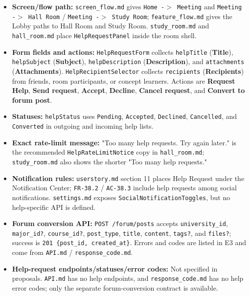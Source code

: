\documentclass[12pt]{article}
\begin{document}
\begin{itemize}
\item \textbf{Screen/flow path:} \texttt{screen\_flow.md} gives \texttt{Home -$>$ Meeting} and \texttt{Meeting -$>$ Hall Room} / \texttt{Meeting -$>$ Study Room}; \texttt{feature\_flow.md} gives the Lobby paths to Hall Room and Study Room. \texttt{study\_room.md} and \texttt{hall\_room.md} place \texttt{HelpRequestPanel} inside the room shell.
\item \textbf{Form fields and actions:} \texttt{HelpRequestForm} collects \texttt{helpTitle} (\textbf{Title}), \texttt{helpSubject} (\textbf{Subject}), \texttt{helpDescription} (\textbf{Description}), and \texttt{attachments} (\textbf{Attachments}). \texttt{HelpRecipientSelector} collects \texttt{recipients} (\textbf{Recipients}) from friends, room participants, or concept learners. Actions are \textbf{Request Help}, \textbf{Send request}, \textbf{Accept}, \textbf{Decline}, \textbf{Cancel request}, and \textbf{Convert to forum post}.
\item \textbf{Statuses:} \texttt{helpStatus} uses \texttt{Pending}, \texttt{Accepted}, \texttt{Declined}, \texttt{Cancelled}, and \texttt{Converted} in outgoing and incoming help lists.
\item \textbf{Exact rate-limit message:} "Too many help requests. Try again later." is the recommended \texttt{HelpRateLimitNotice} copy in \texttt{hall\_room.md}; \texttt{study\_room.md} also shows the shorter "Too many help requests."
\item \textbf{Notification rules:} \texttt{userstory.md} section 11 places Help Request under the Notification Center; \texttt{FR-38.2} / \texttt{AC-38.3} include help requests among social notifications. \texttt{settings.md} exposes \texttt{SocialNotificationToggles}, but no help-specific API is defined.
\item \textbf{Forum conversion API:} \texttt{POST /forum/posts} accepts \texttt{university\_id}, \texttt{major\_id?}, \texttt{course\_id?}, \texttt{post\_type}, \texttt{title}, \texttt{content}, \texttt{tags?}, and \texttt{files?}; success is \texttt{201 \{post\_id, created\_at\}}. Errors and codes are listed in E3 and come from \texttt{API.md} / \texttt{response\_code.md}.
\item \textbf{Help-request endpoints/statuses/error codes:} Not specified in proposals. \texttt{API.md} has no help endpoints, and \texttt{response\_code.md} has no help error codes; only the separate forum-conversion contract is available.
\end{itemize}
\par\medskip
\end{document}
